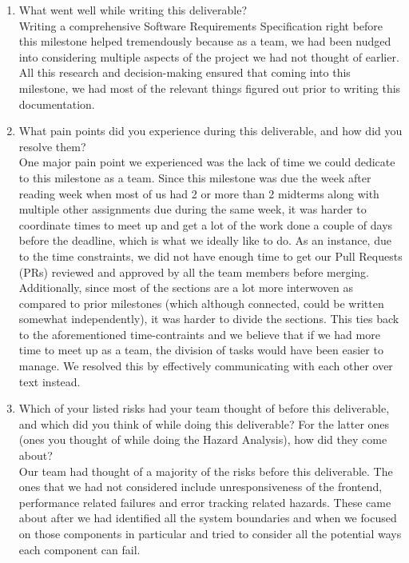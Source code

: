 \documentclass{article}
\begin{document}
\begin{enumerate}
    \item What went well while writing this deliverable?\\
    
    Writing a comprehensive Software Requirements Specification right before this milestone
    helped tremendously because as a team, we had been nudged into considering multiple aspects
    of the project we had not thought of earlier. All this research and decision-making ensured
    that coming into this milestone, we had most of the relevant things figured out prior to writing
    this documentation.
    \item What pain points did you experience during this deliverable, and how
    did you resolve them?\\
    
    One major pain point we experienced was the lack of time we could dedicate to this milestone as
    a team. Since this milestone was due the week after reading week when most of us had 2 or more than 2 midterms along
    with multiple other assignments due during the same week, it was harder to coordinate times to meet up and get a lot of the work done
    a couple of days before the deadline, which is what we ideally like to do. As an instance, due to the time constraints, 
    we did not have enough time to get our Pull Requests (PRs) reviewed and approved by all the team members before merging.\\
    \newline
    Additionally, since most of the sections are a lot more interwoven as compared to prior milestones (which although connected,
    could be written somewhat independently), it was harder to divide the sections. This ties back to the aforementioned 
    time-contraints and we believe that if we had more time to meet up as a team, the division of tasks would have been easier
    to manage.  We resolved this by effectively communicating with each other over text instead.
    
    \item Which of your listed risks had your team thought of before this
    deliverable, and which did you think of while doing this deliverable? For
    the latter ones (ones you thought of while doing the Hazard Analysis), how
    did they come about?\\

    Our team had thought of a majority of the risks before this deliverable. The ones that we had not
    considered include unresponsiveness of the frontend, performance related failures and error tracking related hazards.
    These came about after we had identified all the system boundaries and when we focused on those components in particular
    and tried to consider all the potential ways each component can fail.


\end{enumerate}
\end{document}
